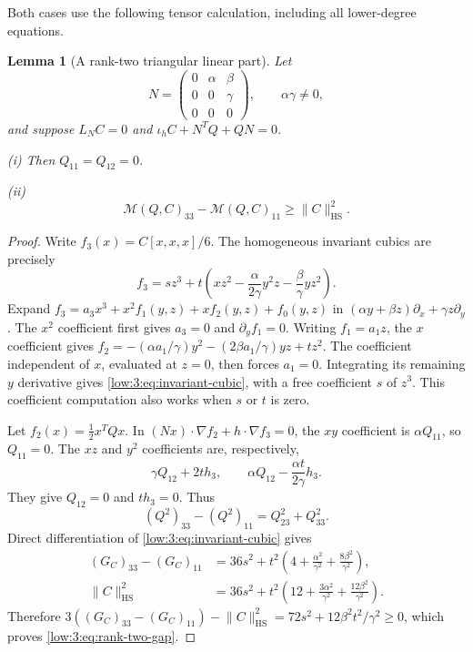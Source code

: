 \documentclass[11pt]{amsart}
\newtheorem{lemma}[theorem]{Lemma}
\theoremstyle{definition}
\theoremstyle{remark}
\newcommand{\norm}[1]{\lVert #1\rVert}
\numberwithin{equation}{section}
\begin{document}
Both cases use the following tensor calculation, including all lower-degree equations.

\begin{lemma}[A rank-two triangular linear part]\label{low:3:lem:rank-two}
Let
\[
N=\begin{pmatrix}0&\alpha&\beta\\0&0&\gamma\\0&0&0\end{pmatrix},\qquad \alpha\gamma\ne0,
\]
and suppose $L_NC=0$ and $\iota_hC+N^TQ+QN=0$.

\noindent\textup{(i)} Then $Q_{11}=Q_{12}=0$.

\noindent\textup{(ii)} \begin{equation}\label{low:3:eq:rank-two-gap} \mathscr M(Q,C)_{33}-\mathscr M(Q,C)_{11}\geq\norm C_{\mathrm{HS}}^2. \end{equation}
\end{lemma}

\begin{proof}
Write $f_3(x)=C[x,x,x]/6$. The homogeneous invariant cubics are precisely
\begin{equation}\label{low:3:eq:invariant-cubic}
f_3=s z^3+t\left(xz^2-\frac{\alpha}{2\gamma}y^2z-\frac{\beta}{\gamma}yz^2\right).
\end{equation}
Expand $f_3=a_3x^3+x^2f_1(y,z)+xf_2(y,z)+f_0(y,z)$ in $(\alpha y+\beta z)\partial_x+\gamma z\partial_y$. The $x^2$ coefficient first gives $a_3=0$ and $\partial_yf_1=0$. Writing $f_1=a_1z$, the $x$ coefficient gives $f_2=-(\alpha a_1/\gamma)y^2-(2\beta a_1/\gamma)yz+tz^2$. The coefficient independent of $x$, evaluated at $z=0$, then forces $a_1=0$. Integrating its remaining $y$ derivative gives \eqref{low:3:eq:invariant-cubic}, with a free coefficient $s$ of $z^3$. This coefficient computation also works when $s$ or $t$ is zero.

Let $f_2(x)=\tfrac12x^TQx$. In $(Nx)\cdot\nabla f_2+h\cdot\nabla f_3=0$, the $xy$ coefficient is $\alpha Q_{11}$, so $Q_{11}=0$. The $xz$ and $y^2$ coefficients are, respectively,
\[
\gamma Q_{12}+2t h_3,\qquad \alpha Q_{12}-\frac{\alpha t}{2\gamma}h_3.
\]
They give $Q_{12}=0$ and $t h_3=0$. Thus
\[
(Q^2)_{33}-(Q^2)_{11}=Q_{23}^2+Q_{33}^2.
\]
Direct differentiation of \eqref{low:3:eq:invariant-cubic} gives
\begin{align*}
(G_C)_{33}-(G_C)_{11}&=36s^2+t^2\left(4+\frac{\alpha^2}{\gamma^2}+\frac{8\beta^2}{\gamma^2}\right),\\
\norm C_{\mathrm{HS}}^2&=36s^2+t^2\left(12+\frac{3\alpha^2}{\gamma^2}+\frac{12\beta^2}{\gamma^2}\right).
\end{align*}
Therefore $3((G_C)_{33}-(G_C)_{11})-\norm C_{\mathrm{HS}}^2=72s^2+12\beta^2t^2/\gamma^2\geq0$, which proves \eqref{low:3:eq:rank-two-gap}.
\end{proof}
\end{document}
